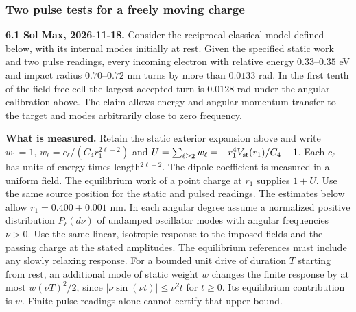 \documentclass[11pt,a4paper]{article}
\begin{document}
\subsubsection{Two pulse tests for a freely moving
charge}\label{two-pulse-tests-for-a-freely-moving-charge}

\textbf{6.1 Sol Max, 2026-11-18.} Consider the reciprocal classical
model defined below, with its internal modes initially at rest. Given
the specified static work and two pulse readings, every incoming
electron with relative energy \(0.33\)--\(0.35\) eV and impact radius
\(0.70\)--\(0.72\) nm turns by more than \(0.0133\) rad. In the first
tenth of the field-free cell the largest accepted turn is \(0.0128\) rad
under the angular calibration above. The claim allows energy and angular
momentum transfer to the target and modes arbitrarily close to zero
frequency.

\textbf{What is measured.} Retain the static exterior expansion above
and write \(w_1=1\), \(w_\ell=c_\ell/(C_4 r_1^{2\ell-2})\) and
\(U=\sum_{\ell\ge2}w_\ell=-r_1^4 V_{\rm st}(r_1)/C_4-1\). Each
\(c_\ell\) has units of energy times length\(^{2\ell+2}\). The dipole
coefficient is measured in a uniform field. The equilibrium work of a
point charge at \(r_1\) supplies \(1+U\). Use the same source position
for the static and pulsed readings. The estimates below allow
\(r_1=0.400\pm0.001\) nm. In each angular degree assume a normalized
positive distribution \(P_\ell(d\nu)\) of undamped oscillator modes with
angular frequencies \(\nu>0\). Use the same linear, isotropic response
to the imposed fields and the passing charge at the stated amplitudes.
The equilibrium references must include any slowly relaxing response.
For a bounded unit drive of duration \(T\) starting from rest, an
additional mode of static weight \(w\) changes the finite response by at
most \(w(\nu T)^2/2\), since \(|\nu\sin(\nu t)|\le\nu^2t\) for
\(t\ge0\). Its equilibrium contribution is \(w\). Finite pulse readings
alone cannot certify that upper bound.
\end{document}
